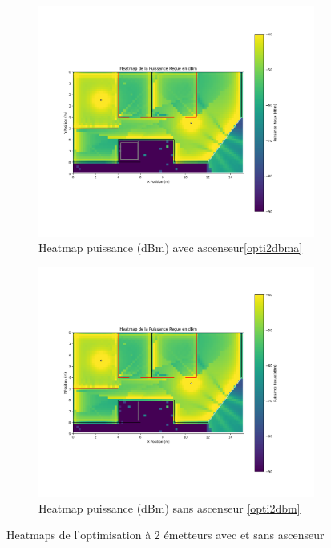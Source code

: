 \begin{figure}[H]
\centering
\begin{subfigure}[b]{0.48\textwidth}
    \centering
    \includegraphics[width=\textwidth]{Pictures/opti2dbma.png}
    \caption{Heatmap puissance (dBm) avec ascenseur\ref{opti2dbma}}
    \label{fig:}
\end{subfigure}
\hfill
\begin{subfigure}[b]{0.48\textwidth}
    \centering
    \includegraphics[width=\textwidth]{Pictures/opti2dbm.png}
    \caption{Heatmap puissance (dBm) sans ascenseur \ref{opti2dbm}}
    \label{fig:}
\end{subfigure}
\caption{Heatmaps de l'optimisation à 2 émetteurs avec et sans ascenseur }
\label{okem}
\end{figure}

